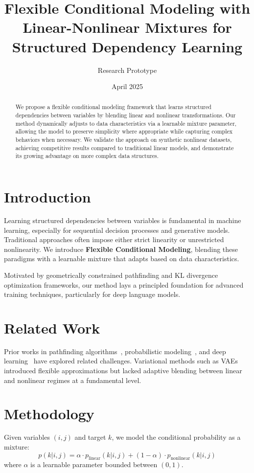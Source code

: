 \documentclass[11pt]{article}
\title{Flexible Conditional Modeling with Linear-Nonlinear Mixtures for Structured Dependency Learning}
\author{Research Prototype}
\date{April 2025}
\begin{document}
\maketitle

\begin{abstract}
We propose a flexible conditional modeling framework that learns structured dependencies between variables by blending linear and nonlinear transformations. Our method dynamically adjusts to data characteristics via a learnable mixture parameter, allowing the model to preserve simplicity where appropriate while capturing complex behaviors when necessary. We validate the approach on synthetic nonlinear datasets, achieving competitive results compared to traditional linear models, and demonstrate its growing advantage on more complex data structures.
\end{abstract}

\section{Introduction}
Learning structured dependencies between variables is fundamental in machine learning, especially for sequential decision processes and generative models. Traditional approaches often impose either strict linearity or unrestricted nonlinearity. We introduce \textbf{Flexible Conditional Modeling}, blending these paradigms with a learnable mixture that adapts based on data characteristics.

Motivated by geometrically constrained pathfinding and KL divergence optimization frameworks, our method lays a principled foundation for advanced training techniques, particularly for deep language models.

\section{Related Work}
\label{sec:related}
Prior works in pathfinding algorithms~\cite{lavalle2006planning}, probabilistic modeling~\cite{cover2006elements}, and deep learning~\cite{goodfellow2016deep} have explored related challenges. Variational methods such as VAEs~\cite{kingma2014auto} introduced flexible approximations but lacked adaptive blending between linear and nonlinear regimes at a fundamental level.

\section{Methodology}
Given variables $(i, j)$ and target $k$, we model the conditional probability as a mixture:
\begin{equation}
    p(k|i,j) = \alpha \cdot p_{\text{linear}}(k|i,j) + (1-\alpha) \cdot p_{\text{nonlinear}}(k|i,j)
\end{equation}
where $\alpha$ is a learnable parameter bounded between $(0,1)$.
\end{document}
